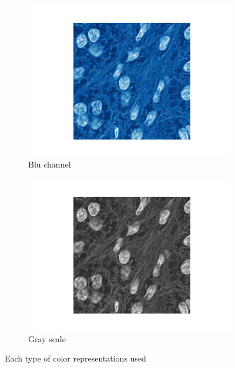 \documentclass[target=bach,aauheader=,style=]{thud}
\begin{document}
\begin{figure}[h!]
    \begin{subfigure}{0.45\textwidth}
        \centering
        \includegraphics[width=\linewidth]{imgs/Blu.png}
        \caption{Blu channel}
    \end{subfigure}
    \hspace{0.2cm}
    \begin{subfigure}{0.45\textwidth}
        \centering
        \includegraphics[width=\linewidth]{imgs/Gray.png}
        \caption{Gray scale}
    \end{subfigure}
    
    \caption{Each type of color representations used}
    \label{fig:quattro_immagini}
\end{figure}
\end{document}
